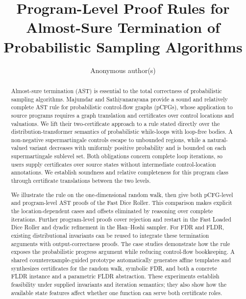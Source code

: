 \documentclass[runningheads]{llncs}
\begin{document}
\title{Program-Level Proof Rules for Almost-Sure Termination of Probabilistic Sampling Algorithms}

\author{Anonymous author(s)}
\institute{}

\maketitle

\begin{abstract}
Almost-sure termination (AST) is essential to the total correctness of probabilistic sampling algorithms. Majumdar and Sathiyanarayana provide a sound and relatively complete AST rule for probabilistic control-flow graphs (pCFGs), whose application to source programs requires a graph translation and certificates over control locations and valuations. We lift their two-certificate approach to a rule stated directly over the distribution-transformer semantics of probabilistic while-loops with loop-free bodies. A non-negative supermartingale controls escape to unbounded regions, while a natural-valued variant decreases with uniformly positive probability and is bounded on each supermartingale sublevel set. Both obligations concern complete loop iterations, so users supply certificates over source states without intermediate control-location annotations. We establish soundness and relative completeness for this program class through certificate translations between the two levels.

We illustrate the rule on the one-dimensional random walk, then give both pCFG-level and program-level AST proofs of the Fast Dice Roller. This comparison makes explicit the location-dependent cases and offsets eliminated by reasoning over complete iterations. Further program-level proofs cover rejection and restart in the Fast Loaded Dice Roller and dyadic refinement in the Han--Hoshi sampler. For FDR and FLDR, existing distributional invariants can be reused to integrate these termination arguments with output-correctness proofs. The case studies demonstrate how the rule exposes the probabilistic progress argument while reducing control-flow bookkeeping. A shared counterexample-guided prototype automatically generates affine templates and synthesizes certificates for the random walk, symbolic FDR, and both a concrete FLDR instance and a parametric FLDR abstraction. These experiments establish feasibility under supplied invariants and iteration semantics; they also show how the available state features affect whether one function can serve both certificate roles.

\end{abstract}
\end{document}
